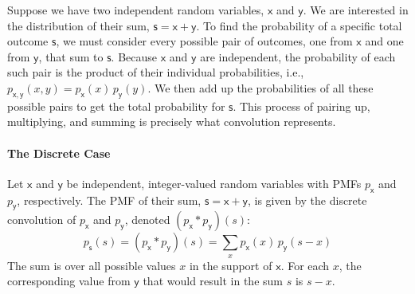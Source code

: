 Suppose we have two independent random variables, $\mathsf{x}$ and $\mathsf{y}$. We are interested in the distribution of their sum, $\mathsf{s} = \mathsf{x} + \mathsf{y}$. To find the probability of a specific total outcome $\mathsf{s}$, we must consider every possible pair of outcomes, one from $\mathsf{x}$ and one from $\mathsf{y}$, that sum to $\mathsf{s}$. Because $\mathsf{x}$ and $\mathsf{y}$ are independent, the probability of each such pair is the product of their individual probabilities, i.e., $p_{\mathsf{x,y}}(x,y) = p_{\mathsf{x}}(x)\, p_{\mathsf{y}}(y)$. We then add up the probabilities of all these possible pairs to get the total probability for $\mathsf{s}$. This process of pairing up, multiplying, and summing is precisely what convolution represents.

\paragraph*{The Discrete Case}
Let $\mathsf{x}$ and $\mathsf{y}$ be independent, integer-valued random variables with PMFs $p_{\mathsf{x}}$ and $p_{\mathsf{y}}$, respectively. The PMF of their sum, $\mathsf{s} = \mathsf{x} + \mathsf{y}$, is given by the discrete convolution of $p_{\mathsf{x}}$ and $p_{\mathsf{y}}$, denoted $(p_{\mathsf{x}} * p_{\mathsf{y}})(s)$:
\begin{equation}
    p_{\mathsf{s}}(s) = (p_{\mathsf{x}} * p_{\mathsf{y}})(s) = \sum_{x} p_{\mathsf{x}}(x) \, p_{\mathsf{y}}(s-x)
\end{equation}
The sum is over all possible values $x$ in the support of $\mathsf{x}$. For each $x$, the corresponding value from $\mathsf{y}$ that would result in the sum $s$ is $s-x$.

